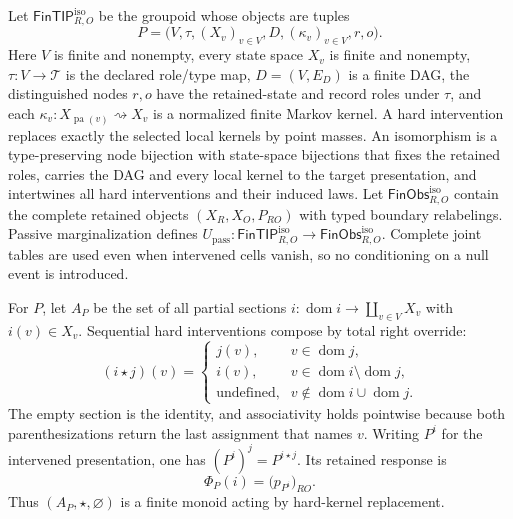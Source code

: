 Let \(\mathsf{FinTIP}_{R,O}^{\mathrm{iso}}\) be the groupoid whose objects are
tuples
\begin{equation}
P=\bigl(V,\tau,(X_v)_{v\in V},D,(\kappa_v)_{v\in V},r,o\bigr).
\label{eq:hist-intervention-raw-presentation}
\end{equation}
Here \(V\) is finite and nonempty, every state space \(X_v\) is finite and
nonempty, \(\tau:V\to\mathcal T\) is the declared role/type map,
\(D=(V,E_D)\) is a finite DAG, the distinguished nodes \(r,o\) have the
retained-state and record roles under \(\tau\), and each
\(\kappa_v:X_{\operatorname{pa}(v)}\rightsquigarrow X_v\) is a normalized
finite Markov kernel.  A hard intervention replaces exactly the selected
local kernels by point masses.  An isomorphism is a type-preserving node
bijection with state-space bijections that fixes the retained roles, carries
the DAG and every local kernel to the target presentation, and intertwines
all hard interventions and their induced laws.  Let
\(\mathsf{FinObs}_{R,O}^{\mathrm{iso}}\) contain the complete retained
objects \((X_R,X_O,P_{RO})\) with typed boundary relabelings.  Passive
marginalization defines
\(U_{\mathrm{pass}}:\mathsf{FinTIP}_{R,O}^{\mathrm{iso}}
\to\mathsf{FinObs}_{R,O}^{\mathrm{iso}}\).  Complete joint tables are used
even when intervened cells vanish, so no conditioning on a null event is
introduced.  

For \(P\), let \(A_P\) be the set of all partial sections
\(i:\operatorname{dom}i\to\coprod_{v\in V}X_v\) with
\(i(v)\in X_v\).  Sequential hard interventions compose by total right
override:
\begin{equation}
(i\star j)(v)=
\begin{cases}
j(v),&v\in\operatorname{dom}j,\\
i(v),&v\in\operatorname{dom}i\setminus\operatorname{dom}j,\\
\text{undefined},&v\notin\operatorname{dom}i\cup\operatorname{dom}j.
\end{cases}
\label{eq:hist-intervention-right-override}
\end{equation}
The empty section is the identity, and associativity holds pointwise because
both parenthesizations return the last assignment that names \(v\).
Writing \(P^i\) for the intervened presentation, one has
\((P^i)^j=P^{i\star j}\).  Its retained response is
\begin{equation}
\Phi_P(i)=\bigl(p_{P^i}\bigr)_{RO}.
\label{eq:hist-intervention-response}
\end{equation}
Thus \((A_P,\star,\varnothing)\) is a finite monoid acting by hard-kernel
replacement.  

